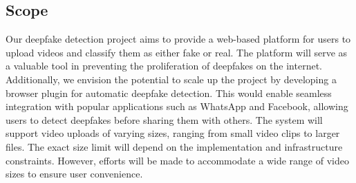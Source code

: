 \subsection{Scope}
Our deepfake detection project aims to provide a web-based platform for users to upload videos and classify them as either fake or real. The platform will serve as a valuable tool in preventing the proliferation of deepfakes on the internet. Additionally, we envision the potential to scale up the project by developing a browser plugin for automatic deepfake detection. This would enable seamless integration with popular applications such as WhatsApp and Facebook, allowing users to detect deepfakes before sharing them with others.
The system will support video uploads of varying sizes, ranging from small video clips to larger files. The exact size limit will depend on the implementation and infrastructure constraints. However, efforts will be made to accommodate a wide range of video sizes to ensure user convenience.
